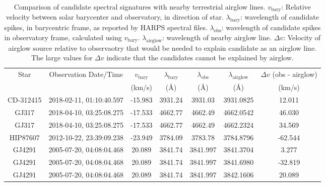 \begin{table}
\begin{center}
    \begin{tabular}{|c|c|c|c|c|c|c|}
    \hline 
    Star & Observation Date/Time  & $v_{\mbox{bary}}$ & $\lambda_{\mbox{bary}}$ & $\lambda_{\mbox{obs}}$ & $\lambda_{\mbox{airglow}}$ & $\Delta v$ (obs - airglow) \\
    & & (km/s) & (\AA) & (\AA) & (\AA) & (km/s) \\
    \hline
    CD-312415 & 2018-02-11, 01:10:40.597 & -15.983 & 3931.24 & 3931.03 & 
    3931.0825 & 12.011 \\
    GJ317 &  2018-04-10, 03:25:08.275 &  -17.533 & 4662.77 & 4662.49 & 
    4662.0542 & 46.030 \\
    GJ317 &  2018-04-10, 03:25:08.275 &  -17.533 & 4662.77 & 4662.49 & 
    4662.2324 & 34.569 \\
    HIP87607 & 2012-10-22, 23:39:09.238 & -23.949 & 3784.09 & 3783.78 &
    3784.8796 & -62.544 \\
    GJ4291 & 2005-07-20, 04:08:04.468 & 20.089 &  3841.74 & 3841.997 &
    3841.3704 & 3.277 \\
    GJ4291 & 2005-07-20, 04:08:04.468 &  20.089 &  3841.74 & 3841.997 &
    3841.6980  & -32.819 \\
    GJ4291 & 2005-07-20, 04:08:04.468 &  20.089 &  3841.74 & 3841.997 &
    3842.1606  & 20.089 \\
    \hline
    \end{tabular}
\end{center}    
\caption{Comparison of candidate spectral signatures with nearby terrestrial airglow lines.  $v_{\mbox{bary}}$:  Relative velocity between solar barycenter and observatory, in direction of star.  $\lambda_{\mbox{bary}}$: wavelength of candidate spikes, in barycentric frame, as reported by HARPS spectral files.  $\lambda_{\mbox{obs}}$: wavelength of candidate spikes in observatory frame, calculated using  $v_{\mbox{bary}}$. 
 $\lambda_{\mbox{airglow}}$: wavelength of nearby airglow line. $\Delta v$: Velocity of airglow source relative to observaotry that would be needed to explain candidate as an airglow line.  The large values for $\Delta v$ indicate that the candidates cannot be explained by airglow. }
\end{table}

